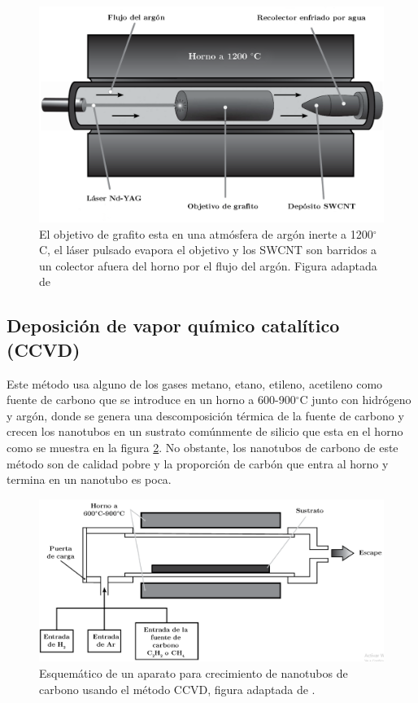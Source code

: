 \begin{figure}[!h]
    \centering
    \includegraphics[width=.6\textwidth,keepaspectratio=true]{CNT/laserablationmethod.png}
    \caption{El objetivo de grafito esta en una atmósfera de argón inerte a 1200$^{\circ}$C, el láser pulsado evapora el objetivo y los SWCNT son barridos a un colector afuera del horno por el flujo del argón. Figura adaptada de \cite{Melendez2016}}
    \label{fig:ablationlasermethod}
\end{figure}

\subsection{Deposición de vapor químico catalítico (CCVD)}

Este método usa alguno de los gases metano, etano, etileno, acetileno como fuente de carbono que se introduce en un horno a 600-900$^{\circ}$C junto con hidrógeno y argón, donde se genera una descomposición térmica de la fuente de carbono y crecen los nanotubos en un sustrato comúnmente de silicio que esta en el horno como se muestra en la figura \ref{fig:ccvdmethod}. No obstante, los nanotubos de carbono de este método son de calidad pobre y la proporción de carbón que entra al horno y termina en un nanotubo es poca.

\begin{figure}[!h]
    \centering
    \includegraphics[width=.6\textwidth,keepaspectratio=true]{CNT/CCVD.png}
    \caption{Esquemático de un aparato  para crecimiento de nanotubos de carbono usando el método CCVD, figura adaptada de \cite{Melendez2016}.}
    \label{fig:ccvdmethod}
\end{figure}

